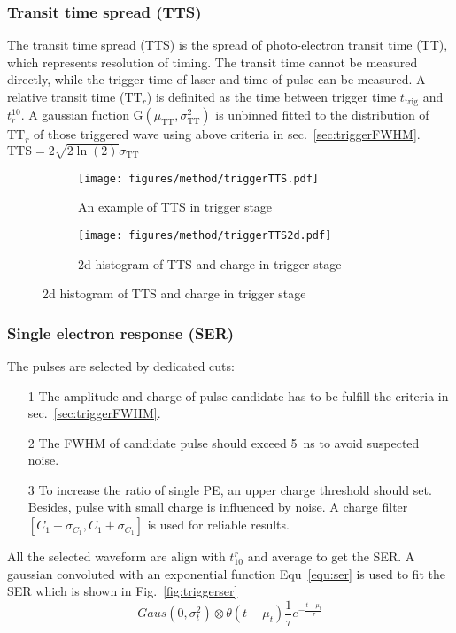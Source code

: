 \subsubsection{Transit time spread (TTS)}
The transit time spread (TTS) is the spread of photo-electron transit time (TT), which represents resolution of timing. The transit time cannot be measured directly, while the trigger time of laser and time of pulse can be measured. A relative transit time ($\mathrm{TT}_r$) is definited as the time between trigger time $t_{\mathrm{trig}}$ and $t_r^{10}$. A gaussian fuction G$(\mu_{\mathrm{TT}},\sigma_{\mathrm{TT}}^2)$ is unbinned fitted to the distribution of $\mathrm{TT}_r$ of those triggered wave using above criteria in sec.~\ref{sec:triggerFWHM}. $\mathrm{TTS}=2\sqrt{2\ln(2)}\sigma_{\mathrm{TT}}$
\begin{figure}[!htbp]
    \centering
    \begin{subfigure}[t]{0.47\textwidth}
        \texttt{[image: figures/method/triggerTTS.pdf]}
        \caption{An example of TTS in trigger stage}
        \label{fig:triggerTTS}
    \end{subfigure}
    \begin{subfigure}[t]{0.47\textwidth}
        \texttt{[image: figures/method/triggerTTS2d.pdf]}
        \caption{2d histogram of TTS and charge in trigger stage}
        \label{fig:triggerTTS2d}
    \end{subfigure}
\end{figure}
\subsubsection{Single electron response (SER)}
The pulses are selected by dedicated cuts:
\begin{itemize}
    \item[1] The amplitude and charge of pulse candidate has to be fulfill the criteria in sec.~\ref{sec:triggerFWHM}.
    \item[2] The FWHM of candidate pulse should exceed \SI{5}{ns} to avoid suspected noise.
    \item[3] To increase the ratio of single PE, an upper charge threshold should set. Besides, pulse with small charge is influenced by noise. A charge filter $[C_1-\sigma_{C_1},C_1+\sigma_{C_1}]$ is used for reliable results.
\end{itemize}
All the selected waveform are align with $t_{10}^r$ and average to get the SER. A gaussian convoluted with an exponential function Equ~\eqref{equ:ser} is used to fit the SER which is shown in Fig.~\ref{fig:triggerser}
\begin{equation}
    \label{equ:ser}
    Gaus(0,\sigma_t^2)\otimes\theta(t-\mu_t)\frac{1}{\tau}e^{-\frac{t-\mu_t}{\tau}}
\end{equation}

